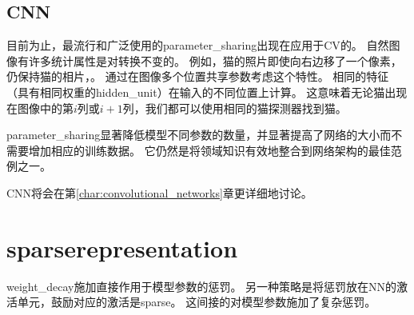 \subsection{\gls{CNN}}
目前为止，最流行和广泛使用的\gls{parameter_sharing}出现在应用于\gls{CV}的。
自然图像有许多统计属性是对转换不变的。
例如，猫的照片即使向右边移了一个像素，仍保持猫的相片，。
通过在图像多个位置共享参数考虑这个特性。
相同的特征（具有相同权重的\gls{hidden_unit}）在输入的不同位置上计算。
这意味着无论猫出现在图像中的第$i$列或$i + 1$列，我们都可以使用相同的猫探测器找到猫。

\gls{parameter_sharing}显著降低模型不同参数的数量，并显著提高了网络的大小而不需要增加相应的训练数据。
它仍然是将领域知识有效地整合到网络架构的最佳范例之一。

\gls{CNN}将会在第\ref{char:convolutional_networks}章更详细地讨论。

\section{\gls{sparse}\gls{representation}}
\label{sec:sparse_representations}
\gls{weight_decay}施加直接作用于模型参数的惩罚。
另一种策略是将惩罚放在\gls{NN}的激活单元，鼓励对应的激活是\gls{sparse}。
这间接的对模型参数施加了复杂惩罚。

